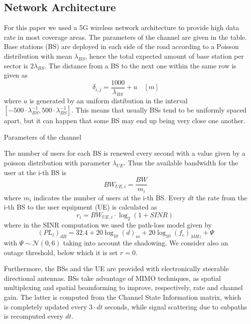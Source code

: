 \documentclass[conference,10pt]{IEEEtran}
\begin{document}
\subsection{Network Architecture}
For this paper we used a 5G wireless network architecture to provide high data rate in most coverage areas. The parameters of the channel are given in the table. Base stations (BS) are deployed in each side of the road according to a Poisson distribution with mean $\lambda_{BS}$, hence the total expected amount of base station per sector is $2\lambda_{BS}$. The distance from a BS to the next one within the same row is given as
\begin{equation}
	\label{eq:distance}
	\delta_{i, j} = \frac{1000}{\lambda_{BS}}+u \quad [m]
\end{equation}
where $u$ is generated by an uniform distibution in the interval $[-500\cdot\lambda_{BS}^{-1},500\cdot\lambda_{BS}^{-1}]$. This means that usually BSs tend to be uniformly spaced apart, but it can happen that some BS may end up being very close one another.  

\begin{table}
	\caption{Parameters of the channel}
	\label{tab:params}
	
\end{table}

The number of users for each BS is renewed every second with a value given by a poisson distribution with parameter $\lambda_{U\!E}$. Thus the available bandwidth for the user at the i-th BS is
\begin{equation}
	\label{bandwidth}
	BW_{U\!E,i} = \frac{BW}{m_i}
\end{equation}
where $m_i$ indicates the number of users at the i-th BS.
Every $dt$ the rate from the i-th BS to the user equipment (UE) is calculated as
\begin{equation}
	\label{eq:rate}
	r_i = BW_{U\!E,i}\cdot\log_2(1+SINR) \	
\end{equation}
where in the SINR computation we used the path-loss model given by
\begin{equation}
	(PL_i)_{dB} = 32.4+20\log_{10}(d)_m+20\log_{10}(f_c)_{M\!H\!z}+\Psi
\end{equation}
with $\Psi\sim \mathcal{N}(0,6)$ taking into account the shadowing. We consider also an outage threshold, below which it is set $r = 0$.

Furthermore, the BSs and the UE are provided with electronically steerable directional antennas. BSs take advantage of MIMO techniques, as spatial multiplexing and spatial beamforming to improve, respectively, rate and channel gain. The latter is computed from the Channel State Information matrix, which is completely updated every $3\cdot dt$ seconds, while signal scattering due to subpaths is recomputed every $dt$.
\end{document}
